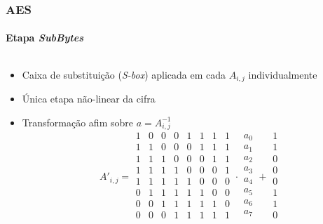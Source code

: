 \documentclass[12pt]{beamer}
\begin{document}
\begin{frame}
    \frametitle{AES}
    \framesubtitle{Etapa \emph{SubBytes}}
    \begin{columns}[T]
        \begin{column}{.7\textwidth}
          \begin{itemize}
                \item Caixa de substituição (\emph{S-box}) aplicada em cada $A_{i,j}$ individualmente
                \item Única etapa não-linear da cifra
                \item Transformação afim sobre $a = A^{-1}_{i,j}$
                    \begin{equation*}
                        A'_{i,j} = 
                        \begin{smallmatrix}
                        1 & 0 & 0 & 0 & 1 & 1 & 1 & 1 \\
                        1 & 1 & 0 & 0 & 0 & 1 & 1 & 1 \\
                        1 & 1 & 1 & 0 & 0 & 0 & 1 & 1 \\
                        1 & 1 & 1 & 1 & 0 & 0 & 0 & 1 \\
                        1 & 1 & 1 & 1 & 1 & 0 & 0 & 0 \\
                        0 & 1 & 1 & 1 & 1 & 1 & 0 & 0 \\
                        0 & 0 & 1 & 1 & 1 & 1 & 1 & 0 \\
                        0 & 0 & 0 & 1 & 1 & 1 & 1 & 1 \\
                        \end{smallmatrix} \cdot
                        \begin{smallmatrix}
                        a_0 \\ a_1 \\ a_2 \\ a_3 \\ a_4 \\ a_5 \\ a_6 \\ a_7 \\
                        \end{smallmatrix} +
                        \begin{smallmatrix}
                        1 \\ 1 \\ 0 \\ 0 \\ 0 \\ 1 \\ 1 \\ 0 \\

\end{smallmatrix}
\end{equation*}
\end{itemize}
\end{column}
\end{columns}
\end{frame}
\end{document}
